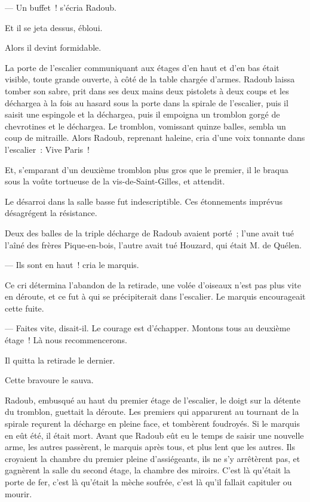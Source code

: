 \documentclass[french,twoside]{book} %
\begin{document}
— Un buffet ! s’écria Radoub.\par
Et il se jeta dessus, ébloui.\par
Alors il devint formidable.\par
La porte de l’escalier communiquant aux étages d’en haut et d’en bas était visible, toute grande ouverte, à côté de la table chargée d’armes. Radoub laissa tomber son sabre, prit dans ses deux mains deux pistolets à deux coups et les déchargea à la fois au hasard sous la porte dans la spirale de l’escalier, puis il saisit une espingole et la déchargea, puis il empoigna un tromblon gorgé de chevrotines et le déchargea. Le tromblon, vomissant quinze balles, sembla un coup de mitraille. Alors Radoub, reprenant haleine, cria d’une voix tonnante dans l’escalier : Vive Paris !\par
Et, s’emparant d’un deuxième tromblon plus gros que le premier, il le braqua sous la voûte tortueuse de la vis-de-Saint-Gilles, et attendit.\par
Le désarroi dans la salle basse fut indescriptible. Ces étonnements imprévus désagrégent la résistance.\par
 Deux des balles de la triple décharge de Radoub avaient porté ; l’une avait tué l’aîné des frères Pique-en-bois, l’autre avait tué Houzard, qui était M. de Quélen.\par
— Ils sont en haut ! cria le marquis.\par
Ce cri détermina l’abandon de la retirade, une volée d’oiseaux n’est pas plus vite en déroute, et ce fut à qui se précipiterait dans l’escalier. Le marquis encourageait cette fuite.\par
— Faites vite, disait-il. Le courage est d’échapper. Montons tous au deuxième étage ! Là nous recommencerons.\par
Il quitta la retirade le dernier.\par
Cette bravoure le sauva.\par
Radoub, embusqué au haut du premier étage de l’escalier, le doigt sur la détente du tromblon, guettait la déroute. Les premiers qui apparurent au tournant de la spirale reçurent la décharge en pleine face, et tombèrent foudroyés. Si le marquis en eût été, il était mort. Avant que Radoub eût eu le temps de saisir une nouvelle arme, les autres passèrent, le marquis après tous, et plus lent que les autres. Ils croyaient la chambre du premier pleine d’assiégeants, ils ne s’y arrêtèrent pas, et gagnèrent la salle du second étage, la chambre des miroirs. C’est là qu’était la porte de fer, c’est là qu’était la mèche soufrée, c’est là qu’il fallait capituler ou mourir.\par
\end{document}
